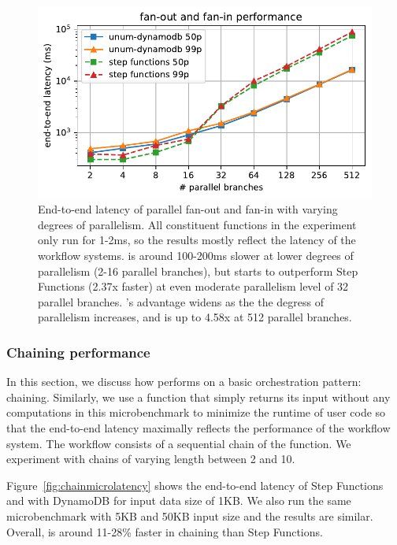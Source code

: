 \begin{figure}[t!]
    \centering
    \includegraphics[width=\columnwidth]{figures/MapMicroLatency.pdf}
    \caption{End-to-end latency of parallel fan-out and fan-in with varying
    degrees of parallelism. All constituent functions in the experiment only
    run for 1-2ms, so the results mostly reflect the latency of the workflow
    systems. \name{} is around 100-200ms slower at lower degrees of
    parallelism (2-16 parallel branches), but starts to outperform Step
    Functions (2.37x faster) at even moderate parallelism level of 32 parallel
    branches. \name{}'s advantage widens as the the degress of parallelism
    increases, and is up to 4.58x at 512 parallel branches.}
    \label{fig:mapmicrolatency}
\end{figure}

\subsubsection{Chaining performance}
In this section, we discuss how \name{} performs on a basic orchestration
pattern: chaining. Similarly, we use a function that simply returns its input
without any computations in this microbenchmark to minimize the runtime of
user code so that the end-to-end latency maximally reflects the performance of
the workflow system. The workflow consists of a sequential chain of the
function. We experiment with chains of varying length between 2 and 10.

Figure~\ref{fig:chainmicrolatency} shows the end-to-end latency of Step
Functions and \name{} with DynamoDB for input data size of 1KB. We also run
the same microbenchmark with 5KB and 50KB input size and the results are
similar. Overall, \name{} is around 11-28\% faster in chaining than Step
Functions.

